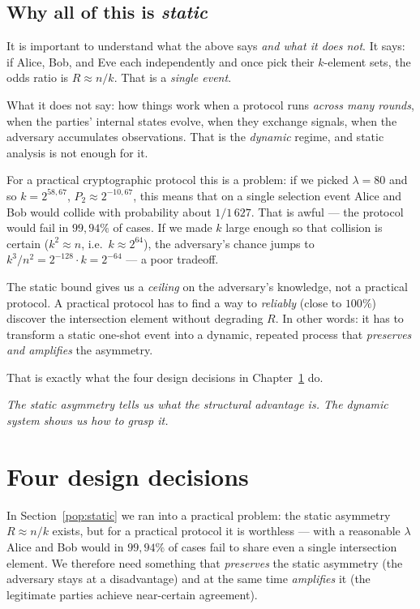 \documentclass[11pt,a4paper]{article}
\begin{document}
\subsection{Why all of this is \emph{static}}

It is important to understand what the above says \emph{and what it does not}. It says: if Alice, Bob, and Eve each independently and once pick their $k$-element sets, the odds ratio is $R \approx n/k$. That is a \emph{single event}.

What it does not say: how things work when a protocol runs \emph{across many rounds}, when the parties' internal states evolve, when they exchange signals, when the adversary accumulates observations. That is the \emph{dynamic} regime, and static analysis is not enough for it.

For a practical cryptographic protocol this is a problem: if we picked $\lambda = 80$ and so $k = 2^{58{,}67}$, $P_2 \approx 2^{-10{,}67}$, this means that on a single selection event Alice and Bob would collide with probability about $1/1\,627$. That is awful --- the protocol would fail in $99{,}94\%$ of cases. If we made $k$ large enough so that collision is certain ($k^2 \approx n$, i.e.\ $k \approx 2^{64}$), the adversary's chance jumps to $k^3/n^2 = 2^{-128} \cdot k = 2^{-64}$ --- a poor tradeoff.

\begin{aha}
The static bound gives us a \emph{ceiling} on the adversary's knowledge, not a practical protocol. A practical protocol has to find a way to \emph{reliably} (close to $100\%$) discover the intersection element without degrading $R$. In other words: it has to transform a static one-shot event into a dynamic, repeated process that \emph{preserves and amplifies} the asymmetry.
\end{aha}

That is exactly what the four design decisions in Chapter~\ref{pop:transformation} do.

\medskip
\noindent\textit{The static asymmetry tells us what the structural advantage is. The dynamic system shows us how to grasp it.}

\section{Four design decisions}\label{pop:transformation}

In Section~\ref{pop:static} we ran into a practical problem: the static asymmetry $R \approx n/k$ exists, but for a practical protocol it is worthless --- with a reasonable $\lambda$ Alice and Bob would in $99{,}94\%$ of cases fail to share even a single intersection element. We therefore need something that \emph{preserves} the static asymmetry (the adversary stays at a disadvantage) and at the same time \emph{amplifies} it (the legitimate parties achieve near-certain agreement).
\end{document}

